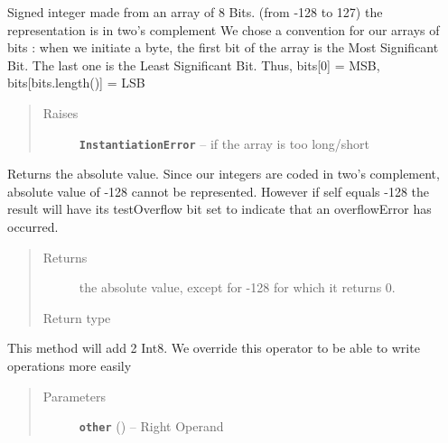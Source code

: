 \documentclass[letterpaper,10pt,english]{sphinxmanual}
\begin{document}
\begin{fulllineitems}
\label{datatypes.integers:datatypes.integers.Int8.Int8}
Signed integer made from an array of 8 Bits. (from -128 to 127)
the representation is in two's complement
We chose a convention for our arrays of bits :
when we initiate a byte, the first bit of the array is the Most Significant Bit.
The last one is the Least Significant Bit.
Thus, bits{[}0{]} = MSB, bits{[}bits.length(){]} = LSB
\begin{quote}\begin{description}
\item[{Raises}] \leavevmode
\textbf{\texttt{InstantiationError}} -- if the array is too long/short

\end{description}\end{quote}

\begin{fulllineitems}
\label{datatypes.integers:datatypes.integers.Int8.Int8.__abs__}
Returns the absolute value. Since our integers are coded in two's complement, absolute value of -128 cannot be represented. However if self equals -128 the result will have its testOverflow bit set to
indicate that an overflowError has occurred.
\begin{quote}\begin{description}
\item[{Returns}] \leavevmode
the absolute value, except for -128 for which it returns 0.

\item[{Return type}] \leavevmode
{\hyperref[datatypes.integers:datatypes.integers.Int8.Int8]{}}

\end{description}\end{quote}

\end{fulllineitems}


\begin{fulllineitems}
\label{datatypes.integers:datatypes.integers.Int8.Int8.__add__}
This method will add 2 Int8.
We override this operator to be able to write operations more easily
\begin{quote}\begin{description}
\item[{Parameters}] \leavevmode
\textbf{\texttt{other}} ({\hyperref[datatypes.integers:datatypes.integers.Int8.Int8]{}}) -- Right Operand


\end{description}
\end{quote}
\end{fulllineitems}
\end{fulllineitems}
\end{document}
